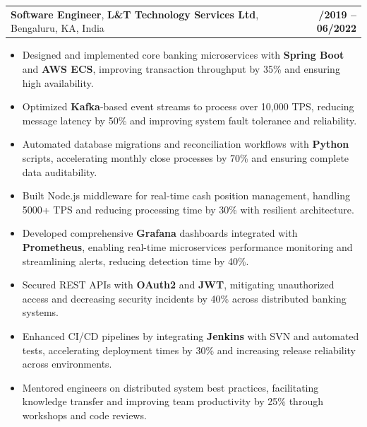 \documentclass[letterpaper,11pt]{article}
\makeatletter
\newcommand{\resumeItem}[1]{
  \item\footnotesize{
    {#1 \vspace{-2pt}}
  }
}
\newcommand{\resumeSubheading}[4]{
  \vspace{-2pt}\item
    \begin{tabular*}{1.0\textwidth}[t]{l@{\extracolsep{\fill}}r}
      \textbf{\fontsize{10pt}{14pt}\selectfont #3}, \textbf{\fontsize{10pt}{14pt}\selectfont #1}, \fontsize{10pt}{14pt}\selectfont #4 & \textbf{\fontsize{10pt}{14pt}\selectfont #2} \\
    \end{tabular*}\vspace{-7pt}
}
\newcommand{\resumeItemListStart}{\begin{itemize}[leftmargin=*]}
\newcommand{\resumeItemListEnd}{\end{itemize}\vspace{-5pt}}
\makeatother
\begin{document}
    \resumeSubheading
        {L\&T Technology Services Ltd}{08/2019 -- 06/2022}
        {Software Engineer}{Bengaluru, KA, India}
      \resumeItemListStart
        \resumeItem{Designed and implemented core banking microservices with \textbf{Spring Boot} and \textbf{AWS ECS}, improving transaction throughput by 35\% and ensuring high availability.}
        \resumeItem{Optimized \textbf{Kafka}-based event streams to process over 10,000 TPS, reducing message latency by 50\% and improving system fault tolerance and reliability.}
        \resumeItem{Automated database migrations and reconciliation workflows with \textbf{Python} scripts, accelerating monthly close processes by 70\% and ensuring complete data auditability.}
        \resumeItem{Built Node.js middleware for real-time cash position management, handling 5000+ TPS and reducing processing time by 30\% with resilient architecture.}
        \resumeItem{Developed comprehensive \textbf{Grafana} dashboards integrated with \textbf{Prometheus}, enabling real-time microservices performance monitoring and streamlining alerts, reducing detection time by 40\%.}
        \resumeItem{Secured REST APIs with \textbf{OAuth2} and \textbf{JWT}, mitigating unauthorized access and decreasing security incidents by 40\% across distributed banking systems.}
        \resumeItem{Enhanced CI/CD pipelines by integrating \textbf{Jenkins} with SVN and automated tests, accelerating deployment times by 30\% and increasing release reliability across environments.}
        \resumeItem{Mentored engineers on distributed system best practices, facilitating knowledge transfer and improving team productivity by 25\% through workshops and code reviews.}
      \resumeItemListEnd
\end{document}
